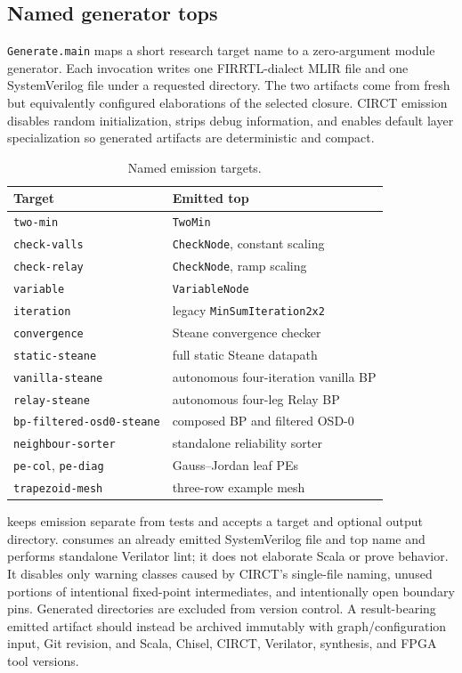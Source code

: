 \documentclass[10pt,conference]{IEEEtran}
\begin{document}
\subsection{Named generator tops}
\texttt{Generate.main} maps a short research target name to a zero-argument
module generator.  Each invocation writes one FIRRTL-dialect MLIR file and one
SystemVerilog file under a requested directory.  The two artifacts come from
fresh but equivalently configured elaborations of the selected closure.  CIRCT
emission disables random initialization, strips debug information, and enables
default layer specialization so generated artifacts are deterministic and
compact.

\begin{table}[t]
\caption{Named emission targets.}
\label{tab:targets}
\centering
\scriptsize
\begin{tabular}{@{}p{}p{}@{}}
\toprule
Target & Emitted top \\
\midrule
\texttt{two-min} & \texttt{TwoMin} \\
\texttt{check-valls} & \texttt{CheckNode}, constant scaling \\
\texttt{check-relay} & \texttt{CheckNode}, ramp scaling \\
\texttt{variable} & \texttt{VariableNode} \\
\texttt{iteration} & legacy \texttt{MinSumIteration2x2} \\
\texttt{convergence} & Steane convergence checker \\
\texttt{static-steane} & full static Steane datapath \\
\texttt{vanilla-steane} & autonomous four-iteration vanilla BP \\
\texttt{relay-steane} & autonomous four-leg Relay BP \\
\texttt{bp-filtered-}\newline\texttt{osd0-steane} & composed BP and filtered OSD-0 \\
\texttt{neighbour-sorter} & standalone reliability sorter \\
\texttt{pe-col}, \texttt{pe-diag} & Gauss--Jordan leaf PEs \\
\texttt{trapezoid-mesh} & three-row example mesh \\
\bottomrule
\end{tabular}
\end{table}

 keeps emission separate from tests and accepts a target
and optional output directory.   consumes an already
emitted SystemVerilog file and top name and performs standalone Verilator lint;
it does not elaborate Scala or prove behavior.  It disables only warning
classes caused by CIRCT's single-file naming, unused portions of intentional
fixed-point intermediates, and intentionally open boundary pins.  Generated
directories are excluded from version control.  A result-bearing emitted
artifact should instead be archived immutably with graph/configuration input,
Git revision, and Scala, Chisel, CIRCT, Verilator, synthesis, and FPGA tool
versions.
\end{document}
